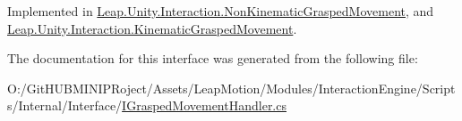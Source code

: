 Implemented in \mbox{\hyperlink{class_leap_1_1_unity_1_1_interaction_1_1_non_kinematic_grasped_movement_a08d130dc9eb2ddc98347725867b2f6de}{Leap.\+Unity.\+Interaction.\+Non\+Kinematic\+Grasped\+Movement}}, and \mbox{\hyperlink{class_leap_1_1_unity_1_1_interaction_1_1_kinematic_grasped_movement_adfd0036833934df0d569feb112c7345e}{Leap.\+Unity.\+Interaction.\+Kinematic\+Grasped\+Movement}}.



The documentation for this interface was generated from the following file\+:\begin{DoxyCompactItemize}
\item 
O\+:/\+Git\+H\+U\+B\+M\+I\+N\+I\+P\+Roject/\+Assets/\+Leap\+Motion/\+Modules/\+Interaction\+Engine/\+Scripts/\+Internal/\+Interface/\mbox{\hyperlink{_i_grasped_movement_handler_8cs}{I\+Grasped\+Movement\+Handler.\+cs}}\end{DoxyCompactItemize}
